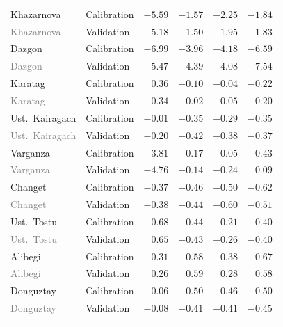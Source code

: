 \begin{longtable}{llrrrr}
\addlinespace
Khazarnova & Calibration & $-5.59$ & $-1.57$ & $-2.25$ & $-1.84$ \\
\textcolor{gray}{Khazarnova} & Validation & $-5.18$ & $-1.50$ & $-1.95$ & $-1.83$ \\
\addlinespace
Dazgon & Calibration & $-6.99$ & $-3.96$ & $-4.18$ & $-6.59$ \\
\textcolor{gray}{Dazgon} & Validation & $-5.47$ & $-4.39$ & $-4.08$ & $-7.54$ \\
\addlinespace
Karatag & Calibration & $0.36$ & $-0.10$ & $-0.04$ & $-0.22$ \\
\textcolor{gray}{Karatag} & Validation & $0.34$ & $-0.02$ & $0.05$ & $-0.20$ \\
\addlinespace
Ust.\  Kairagach & Calibration & $-0.01$ & $-0.35$ & $-0.29$ & $-0.35$ \\
\textcolor{gray}{Ust.\  Kairagach} & Validation & $-0.20$ & $-0.42$ & $-0.38$ & $-0.37$ \\
\addlinespace
Varganza & Calibration & $-3.81$ & $0.17$ & $-0.05$ & $0.43$ \\
\textcolor{gray}{Varganza} & Validation & $-4.76$ & $-0.14$ & $-0.24$ & $0.09$ \\
\addlinespace
Changet & Calibration & $-0.37$ & $-0.46$ & $-0.50$ & $-0.62$ \\
\textcolor{gray}{Changet} & Validation & $-0.38$ & $-0.44$ & $-0.60$ & $-0.51$ \\
\addlinespace
Ust.\  Tostu & Calibration & $0.68$ & $-0.44$ & $-0.21$ & $-0.40$ \\
\textcolor{gray}{Ust.\  Tostu} & Validation & $0.65$ & $-0.43$ & $-0.26$ & $-0.40$ \\
\addlinespace
Alibegi & Calibration & $0.31$ & $0.58$ & $0.38$ & $0.67$ \\
\textcolor{gray}{Alibegi} & Validation & $0.26$ & $0.59$ & $0.28$ & $0.58$ \\
\addlinespace
Donguztay & Calibration & $-0.06$ & $-0.50$ & $-0.46$ & $-0.50$ \\
\textcolor{gray}{Donguztay} & Validation & $-0.08$ & $-0.41$ & $-0.41$ & $-0.45$ \\
\addlinespace
\end{longtable}